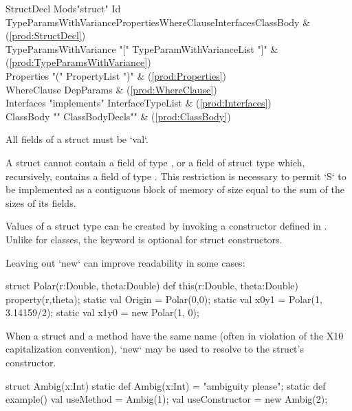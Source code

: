 \begin{bbgrammar}
          StructDecl \: Mods\opt \xcd"struct" Id TypeParamsWithVariance\opt Properties\opt WhereClause\opt Interfaces\opt ClassBody & (\ref{prod:StructDecl}) \\
TypeParamsWithVariance \: \xcd"[" TypeParamWithVarianceList \xcd"]" & (\ref{prod:TypeParamsWithVariance}) \\
          Properties \: \xcd"(" PropertyList \xcd")" & (\ref{prod:Properties}) \\
         WhereClause \: DepParams & (\ref{prod:WhereClause}) \\
          Interfaces \: \xcd"implements" InterfaceTypeList & (\ref{prod:Interfaces}) \\
           ClassBody \: \xcd"{" ClassBodyDecls\opt \xcd"}" & (\ref{prod:ClassBody}) \\
\end{bbgrammar}



All fields of a struct must be \xcd`val`.

A struct  cannot contain a field of type , or a field of struct
type  which, recursively, contains a field of type .  This
restriction is necessary to permit \xcd`S` to be implemented as a contiguous
block of memory of size equal to the sum of the sizes of its fields.  


Values of a struct  type can be created by invoking a constructor
defined in .  Unlike for classes, the   keyword is optional
for struct constructors.  

\begin{ex}
Leaving out \xcd`new` can improve readability in some cases: 
\begin{xten}
struct Polar(r:Double, theta:Double){
  def this(r:Double, theta:Double) {property(r,theta);}
  static val Origin = Polar(0,0);
  static val x0y1   = Polar(1, 3.14159/2);
  static val x1y0   = new Polar(1, 0); 
}
\end{xten}
%


When a struct and a method have the same name (often in violation of the X10
capitalization convention), 
\xcd`new` may be used to resolve to the struct's constructor.  
\begin{xten}
struct Ambig(x:Int) {
  static def Ambig(x:Int) = "ambiguity please";
  static def example() { 
    val useMethod      = Ambig(1);
    val useConstructor = new Ambig(2);
  }
}
\end{xten}
%

\end{ex}

